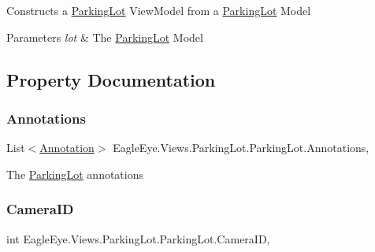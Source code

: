 Constructs a \mbox{\hyperlink{class_eagle_eye_1_1_views_1_1_parking_lot_1_1_parking_lot}{Parking\+Lot}} View\+Model from a \mbox{\hyperlink{class_eagle_eye_1_1_views_1_1_parking_lot_1_1_parking_lot}{Parking\+Lot}} Model 


\begin{DoxyParams}{Parameters}
{\em lot} & The \mbox{\hyperlink{class_eagle_eye_1_1_views_1_1_parking_lot_1_1_parking_lot}{Parking\+Lot}} Model\\
\hline
\end{DoxyParams}


\subsection{Property Documentation}
\mbox{\label{class_eagle_eye_1_1_views_1_1_parking_lot_1_1_parking_lot_a3ce10bda7806c9dcde5a9d0b3c2f2ad7}} 
\subsubsection{\texorpdfstring{Annotations}{Annotations}}
{\footnotesize\ttfamily List$<$\mbox{\hyperlink{class_eagle_eye_1_1_views_1_1_parking_lot_1_1_annotation}{Annotation}}$>$ Eagle\+Eye.\+Views.\+Parking\+Lot.\+Parking\+Lot.\+Annotations\hspace{0.3cm}{\ttfamily [get]}, {\ttfamily [set]}}



The \mbox{\hyperlink{class_eagle_eye_1_1_views_1_1_parking_lot_1_1_parking_lot}{Parking\+Lot}} annotations 

\mbox{\label{class_eagle_eye_1_1_views_1_1_parking_lot_1_1_parking_lot_afaaf127e901804b29115875ae66a9e6a}} 
\subsubsection{\texorpdfstring{CameraID}{CameraID}}
{\footnotesize\ttfamily int Eagle\+Eye.\+Views.\+Parking\+Lot.\+Parking\+Lot.\+Camera\+ID\hspace{0.3cm}{\ttfamily [get]}, {\ttfamily [set]}}



